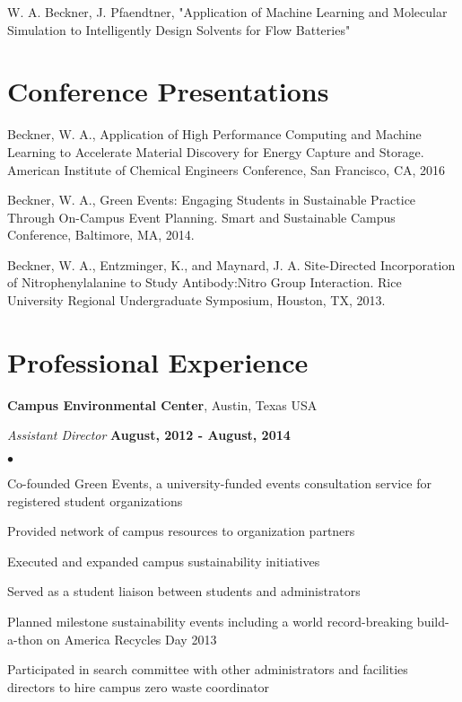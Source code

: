 \documentclass[margin,line]{res}
\newenvironment{list2}{
  \begin{list}{$\bullet$}{%
      \setlength{\itemsep}{0in}
      \setlength{\parsep}{0in} \setlength{\parskip}{0in}
      \setlength{\topsep}{0in} \setlength{\partopsep}{0in} 
      \setlength{\leftmargin}{0.2in}}}{\end{list}}
\begin{document}
\begin{resume}
W. A. Beckner, J. Pfaendtner, "Application of Machine Learning and Molecular Simulation to Intelligently Design Solvents for Flow Batteries" 

\section{\sc Conference Presentations}

Beckner, W. A., Application of High Performance Computing and Machine Learning to Accelerate Material Discovery for Energy Capture and Storage. American Institute of Chemical Engineers Conference, San Francisco, CA, 2016

Beckner, W. A., Green Events: Engaging Students in Sustainable Practice Through On-Campus Event Planning. Smart and Sustainable Campus Conference, Baltimore, MA, 2014.

Beckner, W. A., Entzminger, K., and Maynard, J. A. Site-Directed Incorporation of Nitrophenylalanine to Study Antibody:Nitro Group Interaction. Rice University Regional Undergraduate Symposium, Houston, TX, 2013.


\section{\sc Professional Experience}
{\bf Campus Environmental Center}, Austin, Texas USA

\vspace{-.3cm}
{\em Assistant Director} \hfill {\bf August, 2012 - August, 2014}\\
\begin{list2}
\item Co-founded Green Events, a university-funded events consultation service for registered student organizations
\item Provided network of campus resources to organization partners
\item Executed and expanded campus sustainability initiatives
\item Served as a student liaison between students and administrators
\item Planned milestone sustainability events including a world record-breaking build-a-thon on America Recycles Day 2013
\item Participated in search committee with other administrators and facilities directors to hire campus zero waste coordinator
\end{list2}


\end{resume}
\end{document}
